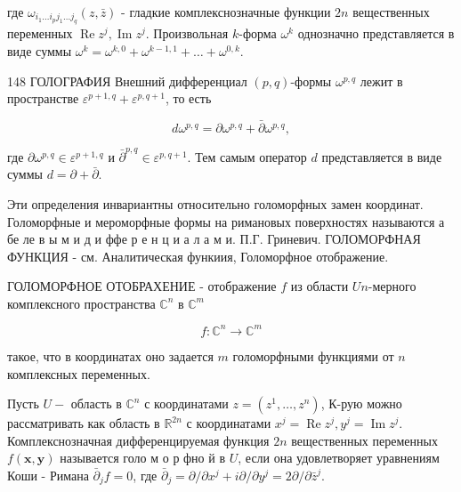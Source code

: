 \documentclass[10pt]{article}
\begin{document}
где $\omega_{i_{1} \ldots i_{p} j_{1} \ldots j_{q}}(z, \bar{z})$ - гладкие комплекснозначные функции $2 n$ вещественных переменных $\operatorname{Re} z^{j}, \operatorname{Im} z^{j}$. Произвольная $k$-форма $\omega^{k}$ однозначно представляется в виде суммы $\omega^{k}=\omega^{k, 0}+\omega^{k-1,1}+\ldots+\omega^{0, k}$.



148 ГОЛОГРАФИЯ Внешний дифференциал $(p, q)$-формы $\omega^{p, q}$ лежит в пространстве $\varepsilon^{p+1, q}+\varepsilon^{p, q+1}$, то есть



\[

d \omega^{p, q}=\partial \omega^{p, q}+\bar{\partial} \omega^{p, q},

\]



где $\partial \omega^{p, q} \in \varepsilon^{p+1, q}$ и $\bar{\partial}^{p, q} \in \varepsilon^{p, q+1}$. Тем самым оператор $d$ представляется в виде суммы $d=\partial+\bar{\partial}$.



Эти определения инвариантны относительно голоморфных замен координат. Голоморфные и мероморфные формы на римановых поверхностях называются а бе ле в ы м и д и ффе р е н ц и а л а м и. П.Г. Гриневич. ГОЛОМОРФНАЯ ФУНКЦИЯ - см. Аналитическая функиия, Голоморфное отображение.



ГОЛОМОРФНОЕ ОТОБРАХЕНИЕ - отображение $f$ из области $U n$-мерного комплексного пространства $\mathbb{C}^{n}$ в $\mathbb{C}^{m}$



\[

f: \mathbb{C}^{n} \rightarrow \mathbb{C}^{m}

\]



такое, что в координатах оно задается $m$ голоморфными функциями от $n$ комплексных переменных.



Пусть $U-$ область в $\mathbb{C}^{n}$ с координатами $z=\left(z^{1}, \ldots, z^{n}\right)$, К-рую можно рассматривать как область в $\mathbb{R}^{2 n}$ с координатами $x^{j}=\operatorname{Re} z^{j}, y^{j}=\operatorname{Im} z^{j}$. Комплекснозначная дифференцируемая функция $2 n$ вещественных переменных $f(\boldsymbol{x}, \boldsymbol{y})$ называется голо м о р фно й в $U$, если она удовлетворяет уравнениям Коши - Римана $\bar{\partial}_{j} f=0$, где $\bar{\partial}_{j}=\partial / \partial x^{j}+i \partial / \partial y^{j}=2 \partial / \partial \bar{z}^{j}$.
\end{document}
